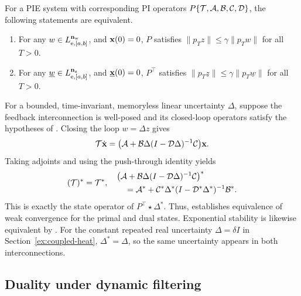 \begin{theorem}\label{thm:dual-l2-gain}
For a PIE system with corresponding PI operators $P\{\mathcal{T}, \mathcal{A}, \mathcal{B},
\mathcal{C}, \mathcal{D}\}$, the following statements are equivalent.
\begin{enumerate}
\item For any $w\in L_{{\mathrm{e}},[a,b]}^{\mathbf{n}_{{\mathrm{w}}}}$, and $\mathbf{x}(0)=0$, $P$
satisfies $\|p_T {z}\| \leq \gamma \|p_T {w}\|$ for all $T>0$.
\item For any $\underline{w}\in L_{{\mathrm{e}},[a,b]}^{\mathbf{n}_{{\mathrm{z}}}}$, and
$\underline{\mathbf{x}}(0)=0$, $P^\top$ satisfies $\|p_T \underline{z}\| \leq
\gamma \|p_T \underline{w}\|$ for all $T>0$.
\end{enumerate}
\end{theorem}
For a bounded, time-invariant, memoryless linear uncertainty
$\Delta$, suppose the feedback interconnection is well-posed
and its closed-loop operators satisfy the hypotheses of
\cite[Thm.~6]{shivaknew}. Closing the loop $w=\Delta z$ gives
\[
\mathcal{T}\dot{\mathbf{x}}
=\bigl(\mathcal{A}+\mathcal{B}\Delta(I-\mathcal{D}\Delta)^{-1}\mathcal{C}\bigr)\mathbf{x}.
\]
Taking adjoints and using the push-through identity yields
\begin{equation*}
(\mathcal{T})^*=\mathcal{T}^*, \quad\begin{aligned}
&\bigl(\mathcal{A}+\mathcal{B}\Delta(I-\mathcal{D}\Delta)^{-1}\mathcal{C}\bigr)^*\\
&\quad=\mathcal{A}^*+\mathcal{C}^*\Delta^*(I-\mathcal{D}^*\Delta^*)^{-1}\mathcal{B}^*.
\end{aligned}
\end{equation*}
This is exactly the state operator of $P^\top\star\Delta^*$. Thus, \cite[Thm.~6]{shivaknew} establishes
equivalence of weak convergence for the primal and dual states. 
Exponential stability is likewise equivalent
by \cite[Cor.~8]{shivaknew}. For the constant repeated real uncertainty
$\Delta=\delta I$ in Section~\ref{ex:coupled-heat},
$\Delta^*=\Delta$, so the same uncertainty appears in both interconnections.
\subsection{Duality under dynamic filtering}

